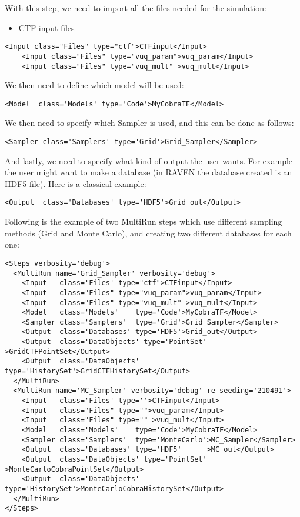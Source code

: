 With this step, we need to import all the files needed for the simulation:
\begin{itemize}
  \item CTF input files
\end{itemize}
\begin{lstlisting}[style=XML,morekeywords={name,class,type}]
    <Input class="Files" type="ctf">CTFinput</Input>
    <Input class="Files" type="vuq_param">vuq_param</Input>
    <Input class="Files" type="vuq_mult" >vuq_mult</Input>
\end{lstlisting}
We then need to define which model will be used:
\begin{lstlisting}[style=XML]
    <Model  class='Models' type='Code'>MyCobraTF</Model>
\end{lstlisting}
We then need to specify which Sampler is used, and this can be done as follows:
\begin{lstlisting}[style=XML]
    <Sampler class='Samplers' type='Grid'>Grid_Sampler</Sampler>
\end{lstlisting}
And lastly, we need to specify what kind of output the user wants.
%
For example the user might want to make a database (in RAVEN the database
created is an HDF5 file).
%
Here is a classical example:
\begin{lstlisting}[style=XML,morekeywords={class,type}]
    <Output  class='Databases' type='HDF5'>Grid_out</Output>
\end{lstlisting}
Following is the example of two MultiRun steps which use different sampling
methods (Grid and Monte Carlo), and creating two different databases for each
one:
\begin{lstlisting}[style=XML]
<Steps verbosity='debug'>
  <MultiRun name='Grid_Sampler' verbosity='debug'>
    <Input   class='Files' type="ctf">CTFinput</Input>
    <Input   class="Files" type="vuq_param">vuq_param</Input>
    <Input   class="Files" type="vuq_mult" >vuq_mult</Input>
    <Model   class='Models'    type='Code'>MyCobraTF</Model>
    <Sampler class='Samplers'  type='Grid'>Grid_Sampler</Sampler>
    <Output  class='Databases' type='HDF5'>Grid_out</Output>
    <Output  class='DataObjects' type='PointSet'   >GridCTFPointSet</Output>
    <Output  class='DataObjects' type='HistorySet'>GridCTFHistorySet</Output>
  </MultiRun>
  <MultiRun name='MC_Sampler' verbosity='debug' re-seeding='210491'>
    <Input   class='Files' type=''>CTFinput</Input>
    <Input   class="Files" type="">vuq_param</Input>
    <Input   class="Files" type="" >vuq_mult</Input>
    <Model   class='Models'    type='Code'>MyCobraTF</Model>
    <Sampler class='Samplers'  type='MonteCarlo'>MC_Sampler</Sampler>
    <Output  class='Databases' type='HDF5'      >MC_out</Output>
    <Output  class='DataObjects' type='PointSet'   >MonteCarloCobraPointSet</Output>
    <Output  class='DataObjects' type='HistorySet'>MonteCarloCobraHistorySet</Output>
  </MultiRun>
</Steps>
\end{lstlisting}

